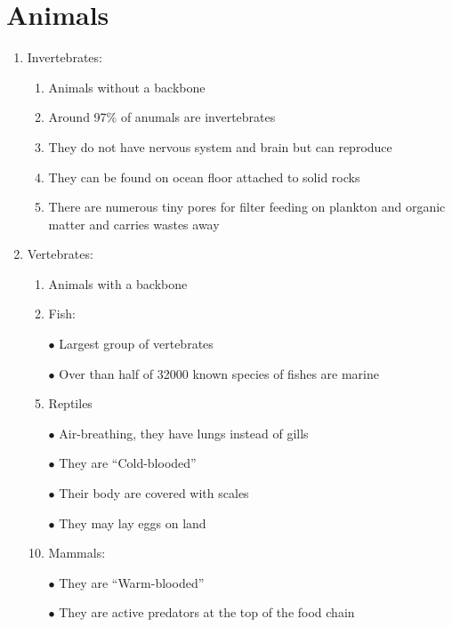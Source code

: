 \documentclass{report}
\begin{document}
\section{Animals}
\begin{enumerate}
    \item Invertebrates:
    \begin{enumerate}
        \item Animals without a backbone
        \item Around 97\% of anumals are invertebrates
        \item They do not have nervous system and brain but can reproduce
        \item They can be found on ocean floor attached to solid rocks
        \item There are numerous tiny pores for filter feeding on plankton and organic matter and carries wastes away
    \end{enumerate}
    \item Vertebrates:
    \begin{enumerate}
        \item Animals with a backbone
        \item Fish:
        \item [$\bullet$]Largest group of vertebrates 
        \item [$\bullet$]Over than half of 32000 known species of fishes are marine
        \item Reptiles
        \item [$\bullet$]Air-breathing, they have lungs instead of gills
        \item [$\bullet$]They are ``Cold-blooded''
        \item [$\bullet$]Their body are covered with scales
        \item [$\bullet$]They may lay eggs on land
        \item Mammals:
        \item [$\bullet$]They are ``Warm-blooded''
        \item [$\bullet$]They are active predators at the top of the food chain
    \end{enumerate}
\end{enumerate}
\end{document}
